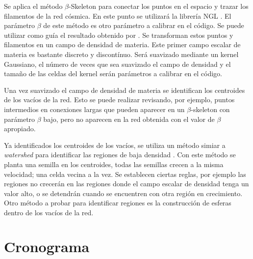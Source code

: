\documentclass[preprint]{aastex62}
\begin{document}
  Se aplica el método $\beta$-Skeleton para conectar los puntos en el espacio y trazar los
  filamentos de la red cósmica. En este punto se utilizará la librería NGL \citep{ngl}.
  El parámetro $\beta$ de este método es otro parámetro a calibrar en el código. Se puede
  utilizar como guía el resultado obtenido por \citet{Fang2018}.
  Se transforman estos puntos y filamentos en un campo de densidad de materia. Este primer
  campo escalar de materia es bastante discreto y discontínuo. Será suavizado mediante un
  kernel Gaussiano, el número de veces que sea suavizado el campo de densidad y el tamaño de
  las celdas del kernel serán parámetros a calibrar en el código.

  Una vez suavizado el campo de densidad de materia se identifican los centroides
  de los vacíos de la red. Esto se puede realizar revisando, por ejemplo, puntos intermedios
  en conexiones largas que pueden aparecer en un $\beta$-skeleton con parámetro $\beta$ bajo,
  pero no aparecen en la red obtenida con el valor de $\beta$ apropiado.

  Ya identificados los centroides de los vacíos, se utiliza un método simiar a \textit{watershed}
  para identificar las regiones de baja densidad \citep{Sutter2015}. Con este método
  se planta una semilla en los centroides, todas las semillas crecen a la misma velocidad; una
  celda vecina a la vez. Se establecen ciertas reglas, por ejemplo las regiones no crecerán en
  las regiones donde el campo escalar de densidad tenga un valor alto, o se detendrán cuando
  se encuentren con otra región en crecimiento. Otro método a probar para identificar regiones
  es la construcción de esferas dentro de los vacíos de la red. 

  \section{Cronograma}
\end{document}
